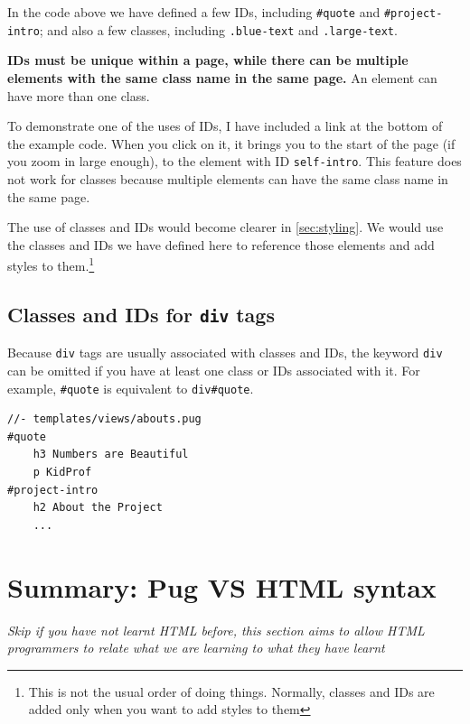 In the code above we have defined a few IDs, including \texttt{\#quote} and \texttt{\#project-intro}; and also a few classes, including \texttt{.blue-text} and \texttt{.large-text}. 
\vspace{6mm}

\textbf{IDs must be unique within a page, while there can be multiple elements with the same class name in the same page.} An element can have more than one class.
\vspace{6mm}

To demonstrate one of the uses of IDs, I have included a link at the bottom of the example code. When you click on it, it brings you to the start of the page (if you zoom in large enough), to the element with ID \texttt{self-intro}. This feature does not work for classes because multiple elements can have the same class name in the same page.

The use of classes and IDs would become clearer in \cref{sec:styling}. We would use the classes and IDs we have defined here to reference those elements and add styles to them.\footnote{This is not the usual order of doing things. Normally, classes and IDs are added only when you want to add styles to them}

\subsection*{Classes and IDs for \texttt{div} tags}

Because \texttt{div} tags are usually associated with classes and IDs, the keyword \texttt{div} can be omitted if you have at least one class or IDs associated with it. For example, \texttt{\#quote} is equivalent to \texttt{div\#quote}.

\begin{lstlisting}[language=pug]
//- templates/views/abouts.pug
#quote
    h3 Numbers are Beautiful
    p KidProf
#project-intro
    h2 About the Project
    ...
\end{lstlisting}

\section{Summary: Pug VS HTML syntax}
\label{sec:pugvshtml}

\textit{Skip if you have not learnt HTML before, this section aims to allow HTML programmers to relate what we are learning to what they have learnt}
\vspace{6mm}

